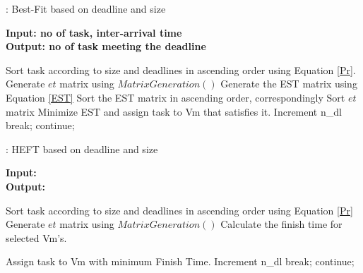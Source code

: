 \documentclass[conference]{IEEEtran}
\begin{document}
\begin{algorithm}
\caption{: Best-Fit based on deadline and size}
\label{euclid}
\hspace*{\algorithmicindent} \textbf{Input: no of task, inter-arrival time} \\
 \hspace*{\algorithmicindent} \textbf{Output: no of task meeting the deadline} 
\begin{algorithmic}[1]
  
   \State Sort task according to size and deadlines in ascending order using Equation \ref{Pr}.
   \State Generate $et$ matrix using $MatrixGeneration()$
   \State Generate the EST matrix using Equation \ref{EST}
   \State Sort the EST matrix in ascending order, correspondingly Sort $et$ matrix
          \State Minimize EST and assign task to Vm that satisfies it.
                  \State Increment n\_dl
                  \State break;
                  \Else
                  \State continue;
               \EndIf
       \EndFor
      \EndIf
    \EndFor   
\EndFor
\end{algorithmic}
\end{algorithm}

\vspace{30pt}

\begin{algorithm}
\caption{: HEFT based on deadline and size}
\label{euclid}
\hspace*{\algorithmicindent} \textbf{Input:} \\
 \hspace*{\algorithmicindent} \textbf{Output:} 
\begin{algorithmic}[1]
  
   \State Sort task according to size and deadlines in ascending order using Equation \ref{Pr}
   \State Generate $et$ matrix using $MatrixGeneration()$
          \State Calculate the finish time for selected Vm's.
          \EndFor
          \EndIf
          \EndFor
          
          \State Assign task to Vm with minimum Finish Time.
                  \State Increment n\_dl
                  \State break;
                  \Else
                  \State continue;
               \EndIf
       \EndFor
      \EndIf
    \EndFor   
\EndFor
\end{algorithmic}
\end{algorithm}
\end{document}
